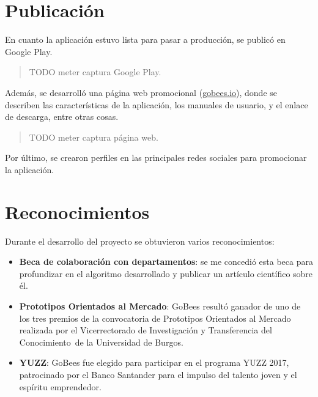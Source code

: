 \section{Publicación}\label{publicacion}

En cuanto la aplicación estuvo lista para pasar a producción, se publicó
en Google Play.

\begin{quote}
TODO meter captura Google Play.
\end{quote}

Además, se desarrolló una página web promocional
(\href{http://gobees.io/}{gobees.io}), donde se describen las
características de la aplicación, los manuales de usuario, y el enlace
de descarga, entre otras cosas.

\begin{quote}
TODO meter captura página web.
\end{quote}

Por último, se crearon perfiles en las principales redes sociales para
promocionar la aplicación.

\section{Reconocimientos}\label{reconocimientos}

Durante el desarrollo del proyecto se obtuvieron varios reconocimientos:

\begin{itemize}
\tightlist
\item
  \textbf{Beca de colaboración con departamentos}: se me concedió esta
  beca para profundizar en el algoritmo desarrollado y publicar un
  artículo científico sobre él.
\item
  \textbf{Prototipos Orientados al Mercado}: GoBees resultó ganador de
  uno de los tres premios de la convocatoria de Prototipos Orientados al
  Mercado realizada por el Vicerrectorado de Investigación y
  Transferencia del Conocimiento~de la Universidad de Burgos.
\item
  \textbf{YUZZ}: GoBees fue elegido para participar en el programa YUZZ
  2017, patrocinado por el Banco Santander para el impulso del talento
  joven y el espíritu emprendedor.
\end{itemize}
